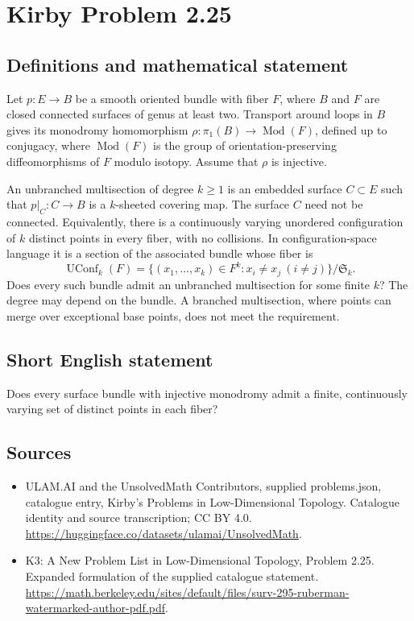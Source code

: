 \documentclass[11pt,a4paper]{article}
\begin{document}
\section*{Kirby Problem 2.25}\label{statement}

\subsection{Definitions and mathematical statement}
Let $p:E\to B$ be a smooth oriented bundle with fiber $F$, where $B$ and $F$
are closed connected surfaces of genus at least two. Transport around loops in
$B$ gives its monodromy homomorphism
$\rho:\pi_1(B)\to\operatorname{Mod}(F)$, defined up to conjugacy, where
$\operatorname{Mod}(F)$ is the group of orientation-preserving diffeomorphisms
of $F$ modulo isotopy. Assume that $\rho$ is injective.

An unbranched multisection of degree $k\geq1$ is an embedded surface
$C\subset E$ such that $p|_C:C\to B$ is a $k$-sheeted covering map. The surface
$C$ need not be connected. Equivalently, there is a continuously varying
unordered configuration of $k$ distinct points in every fiber, with no collisions.
In configuration-space language it is a section of the associated bundle
whose fiber is
\[
 \operatorname{UConf}_k(F)=
 \{(x_1,\ldots,x_k)\in F^k:x_i\ne x_j\ (i\ne j)\}/\mathfrak S_k.
\]
Does every such bundle admit an unbranched multisection for some finite $k$?
The degree may depend on the bundle. A branched multisection, where points can
merge over exceptional base points, does not meet the requirement.
\subsection{Short English statement}
Does every surface bundle with injective monodromy admit a finite, continuously varying set of distinct points in each fiber?
\subsection{Sources}
\begin{itemize}
\item[S1] ULAM.AI and the UnsolvedMath Contributors, supplied problems.json, catalogue entry, Kirby's Problems in Low-Dimensional Topology. Catalogue identity and source transcription; CC BY 4.0.
\url{https://huggingface.co/datasets/ulamai/UnsolvedMath}.
\item[S2] K3: A New Problem List in Low-Dimensional Topology, Problem 2.25. Expanded formulation of the supplied catalogue statement.
\url{https://math.berkeley.edu/sites/default/files/surv-295-ruberman-watermarked-author-pdf.pdf}.
\end{itemize}
\end{document}

